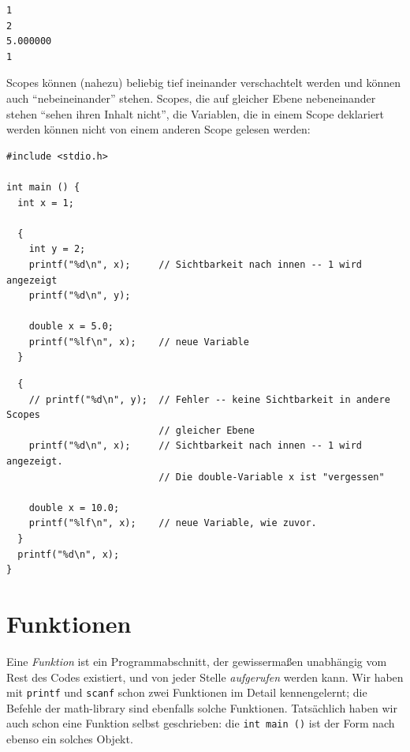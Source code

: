 \begin{cmdbox}
\begin{verbatim}
1
2
5.000000
1
\end{verbatim}
\end{cmdbox}

Scopes können (nahezu) beliebig tief ineinander verschachtelt werden und können auch \enquote{nebeineinander} stehen. Scopes, die auf gleicher Ebene nebeneinander stehen \enquote{sehen ihren Inhalt nicht}, \ie die Variablen, die in einem Scope deklariert werden können nicht von einem anderen Scope gelesen werden:

\begin{codebox}
\begin{verbatim}
#include <stdio.h>

int main () {
  int x = 1;
  
  {
    int y = 2;
    printf("%d\n", x);     // Sichtbarkeit nach innen -- 1 wird angezeigt
    printf("%d\n", y);
    
    double x = 5.0;
    printf("%lf\n", x);    // neue Variable
  }
\end{verbatim}
\end{codebox}
  
\begin{codebox}[]
\begin{verbatim}
  {
    // printf("%d\n", y);  // Fehler -- keine Sichtbarkeit in andere Scopes 
                           // gleicher Ebene
    printf("%d\n", x);     // Sichtbarkeit nach innen -- 1 wird angezeigt. 
                           // Die double-Variable x ist "vergessen"
                           
    double x = 10.0;
    printf("%lf\n", x);    // neue Variable, wie zuvor.
  }
  printf("%d\n", x); 
}
\end{verbatim}
\end{codebox}

\section{Funktionen} \label{sec:funcs}
Eine \emph{Funktion} ist ein Programmabschnitt, der gewissermaßen unabhängig vom Rest des Codes existiert, und von jeder Stelle \emph{aufgerufen} werden kann. Wir haben mit \texttt{printf} und \texttt{scanf} schon zwei Funktionen im Detail kennengelernt; die Befehle der math-library sind ebenfalls solche Funktionen. Tatsächlich haben wir auch schon eine Funktion selbst geschrieben: die \texttt{int main ()} ist der Form nach ebenso ein solches Objekt.

